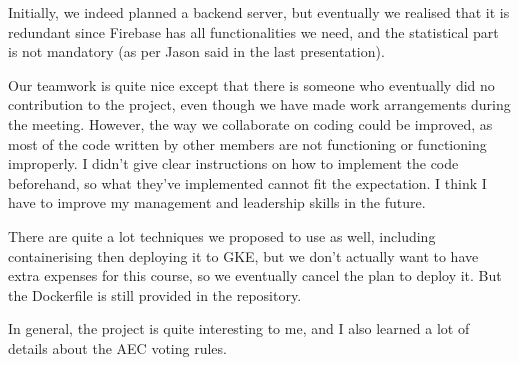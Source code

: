 \documentclass[12pt]{article}
\begin{document}
Initially, we indeed planned a backend server, but eventually we realised that it is redundant since Firebase has all functionalities we need, and the statistical part is not mandatory (as per Jason said in the last presentation).

Our teamwork is quite nice except that there is someone who eventually did no contribution to the project, even though we have made work arrangements during the meeting. However, the way we collaborate on coding could be improved, as most of the code written by other members are not functioning or functioning improperly. I didn't give clear instructions on how to implement the code beforehand, so what they've implemented cannot fit the expectation. I think I have to improve my management and leadership skills in the future.

There are quite a lot techniques we proposed to use as well, including containerising then deploying it to GKE, but we don't actually want to have extra expenses for this course, so we eventually cancel the plan to deploy it. But the Dockerfile is still provided in the repository.

In general, the project is quite interesting to me, and I also learned a lot of details about the AEC voting rules.
\end{document}
